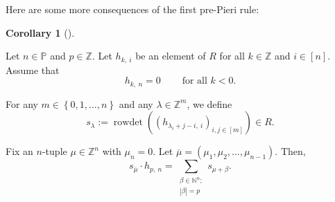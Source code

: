 \documentclass
[numbers=enddot,12pt,final,onecolumn,notitlepage,english]{scrartcl}%
\theoremstyle{definition}
\newtheorem{coro}[theo]{Corollary}
\newenvironment{corollary}[1][]
{\begin{coro}[#1]\begin{leftbar}}
{\end{leftbar}\end{coro}}
\let\sumnonlimits\sum
\renewcommand{\sum}{\sumnonlimits\limits}
\begin{document}
Here are some more consequences of the first pre-Pieri rule:

\begin{corollary}
\label{cor.pre-pieri.4}Let $n\in\mathbb{P}$ and $p\in\mathbb{Z}$. Let
$h_{k,\ i}$ be an element of $R$ for all $k\in\mathbb{Z}$ and $i\in\left[
n\right]  $. Assume that%
\[
h_{k,\ n}=0\ \ \ \ \ \ \ \ \ \ \text{for all }k<0.
\]


For any $m\in\left\{  0,1,\ldots,n\right\}  $ and any $\lambda\in
\mathbb{Z}^{m}$, we define%
\[
s_{\lambda}:=\operatorname*{rowdet}\left(  \left(  h_{\lambda_{i}%
+j-i,\ i}\right)  _{i,j\in\left[  m\right]  }\right)  \in R.
\]


Fix an $n$-tuple $\mu\in\mathbb{Z}^{n}$ with $\mu_{n}=0$. Let $\overline{\mu
}=\left(  \mu_{1},\mu_{2},\ldots,\mu_{n-1}\right)  $. Then,%
\[
s_{\overline{\mu}}\cdot h_{p,\ n}=\sum_{\substack{\beta\in\mathbb{N}%
^{n};\\\left\vert \beta\right\vert =p}}s_{\mu+\beta}.
\]

\end{corollary}
\end{document}
